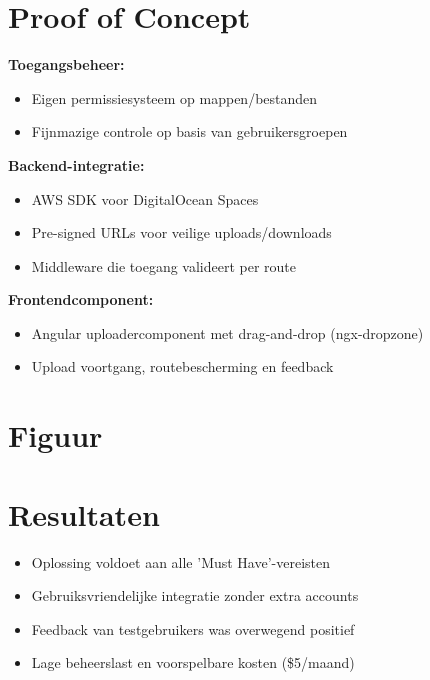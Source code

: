 \documentclass[a0,portrait]{hogent-poster}
\begin{document}
\begin{multicols}{2}
\section{Proof of Concept}
\textbf{Toegangsbeheer:}
\begin{itemize}
  \item Eigen permissiesysteem op mappen/bestanden
  \item Fijnmazige controle op basis van gebruikersgroepen
\end{itemize}

\textbf{Backend-integratie:}
\begin{itemize}
  \item AWS SDK voor DigitalOcean Spaces
  \item Pre-signed URLs voor veilige uploads/downloads
  \item Middleware die toegang valideert per route
\end{itemize}

\textbf{Frontendcomponent:}
\begin{itemize}
  \item Angular uploadercomponent met drag-and-drop (ngx-dropzone)
  \item Upload voortgang, routebescherming en feedback
\end{itemize}

\section{Figuur}
\begin{center}
  \captionsetup{type=figure}
\end{center}

\section{Resultaten}
\begin{itemize}
  \item Oplossing voldoet aan alle 'Must Have'-vereisten
  \item Gebruiksvriendelijke integratie zonder extra accounts
  \item Feedback van testgebruikers was overwegend positief
  \item Lage beheerslast en voorspelbare kosten (\$5/maand)
\end{itemize}


\end{multicols}
\end{document}
